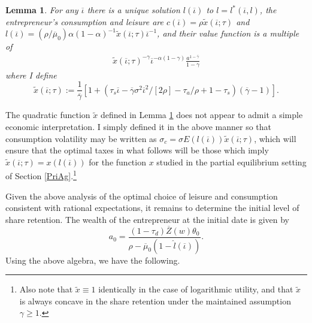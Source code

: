 \documentclass[11pt]{article}
\theoremstyle{plain}
\newtheorem{lemma}[thm]{Lemma}
\begin{document}
\begin{lemma} \label{FIXiota}
For any $\overline{\iota}$ there is a unique solution $l(\overline{\iota})$ to $l = l^*(\overline{\iota}, l)$, the entrepreneur's consumption and leisure are $c(\overline{\iota}) = \rho \tilde{x}(\overline{\iota};\tau)$ and $l(\overline{\iota}) = (\rho/\overline{\mu}_0)\alpha (1-\alpha)^{-1}\tilde{x}(\overline{\iota};\tau)\overline{\iota}^{-1}$, and their value function is a multiple of 
\begin{equation}
\begin{aligned}
\tilde{x}(\overline{\iota};\tau)^{-\gamma} \overline{\iota}^{-\alpha(1-\gamma)} \frac{a^{1-\overline{\gamma}}}{1-\gamma}
\end{aligned}
\label{V}
\end{equation}
where I define
\begin{equation}
\tilde{x}(\overline{\iota}; \tau) := \frac{1}{\overline{\gamma}}{\left[1 + {\left(\tau_s\overline{\iota} - \overline{\gamma}\sigma^2\overline{\iota}^2/[2\rho] -\tau_a/\rho + 1-\tau_s\right)}(\overline{\gamma}-1)\right]}.
\label{x_tilde_func}
\end{equation}
\end{lemma} 


The quadratic function $\tilde{x}$ defined in Lemma \ref{FIXiota} does not appear to admit a simple economic interpretation. I simply defined it in the above manner so that consumption volatility may be written as $\sigma_c = \sigma E(l(\overline{\iota}))\tilde{x}(\overline{\iota};\tau)$, which will ensure that the optimal taxes in what follows will be those which imply $\tilde{x}(\overline{\iota};\tau) = x(l(\overline{\iota}))$ for the function $x$ studied in the partial equilibrium setting of Section \ref{PriAg}.\footnote{Also note that $\tilde{x} \equiv 1$ identically in the case of logarithmic utility, and that $\tilde{x}$ is always concave in the share retention under the maintained assumption $\gamma \geq 1$.}

Given the above analysis of the optimal choice of leisure and consumption consistent with rational expectations, it remains to determine the initial level of share retention. The wealth of the entrepreneur at the initial date is given by 
$$ %
a_0 = \frac{(1-\tau_d) \overline{Z}(w) \theta_0}{\rho - \overline{\mu}_0(1-\hat{l}(\overline{\iota}))}.
$$
Using the above algebra, we have the following. 
\end{document}
